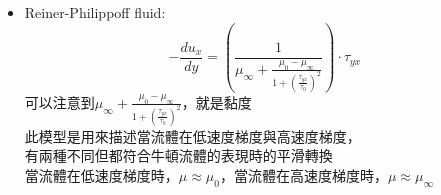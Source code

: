 \documentclass[../main.tex]{subfiles}
\begin{document}
\begin{itemize}
    通常用在描述膏、乳液這種，本來不太會流，但你放在手裡搓，卻很好搓開
  \item Reiner-Philippoff fluid:
    \begin{equation}
      -\frac{du_x}{dy} = \left(\frac{1}{
        \mu_\infty + \frac{\mu_0-\mu_\infty}{1+\left(\frac{\tau_{yx}}{\tau_0}\right)^2}
      }\right)\cdot \tau_{yx}
    \end{equation}
    可以注意到$\mu_\infty + \frac{\mu_0-\mu_\infty}{1+\left(\frac{\tau_{yx}}{\tau_0}\right)^2}$，就是黏度\\
    此模型是用來描述當流體在低速度梯度與高速度梯度，\\
    有兩種不同但都符合牛頓流體的表現時的平滑轉換\\
    當流體在低速度梯度時，$\mu\approx\mu_0$，當流體在高速度梯度時，$\mu\approx\mu_\infty$
\end{itemize}
\end{document}
